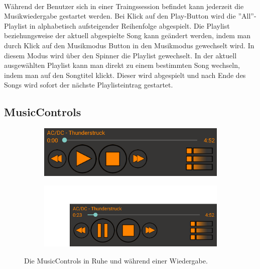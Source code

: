 \documentclass[FIPLY_base.tex]{subfiles}
\begin{document}
\ \\
Während der Benutzer sich in einer Traingssession befindet kann jederzeit die Musikwiedergabe gestartet werden.
Bei Klick auf den Play-Button wird die ''All''-Playlist in alphabetisch aufsteigender Reihenfolge abgespielt. \newline
Die Playlist beziehungsweise der aktuell abgespielte Song kann geändert werden, indem man durch Klick auf den Musikmodus Button in den Musikmodus gewechselt wird. \newline
In diesem Modus wird über den Spinner die Playlist gewechselt. \newline
In der aktuell ausgewählten Playlist kann man direkt zu einem bestimmten Song wechseln, indem man auf den Songtitel klickt. 
Dieser wird abgespielt und nach Ende des Songs wird sofort der nächste Playlisteintrag gestartet.

\newpage
\subsection {MusicControls}

\begin{figure}[h]
	\begin{subfigure}[b]{0.3\textwidth}
	\includegraphics[scale=0.55]{img/musicControls}
	\end{subfigure}
	\hfil
	\begin{subfigure}[b]{0.3\textwidth}
	\includegraphics[scale=0.55]{img/musicControlsPlaying}
	\end{subfigure}
	\caption{Die MusicControls in Ruhe und während einer Wiedergabe.}
\end{figure}
\end{document}
